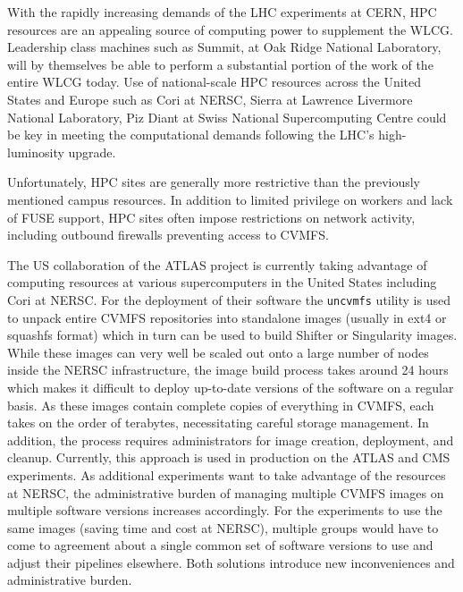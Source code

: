 \documentclass[sigconf]{acmart}
\begin{document}
With the rapidly increasing demands of the LHC experiments at CERN,
HPC resources are an appealing source of computing power to supplement the WLCG.
Leadership class machines such as Summit, at Oak Ridge National Laboratory, will by themselves be able to perform a substantial portion of the work of the entire WLCG today.
Use of national-scale HPC resources across the United States and Europe such as Cori at NERSC, Sierra at Lawrence Livermore National Laboratory, Piz Diant at Swiss National Supercomputing Centre could be key in meeting the computational demands following the LHC's high-luminosity upgrade.

Unfortunately, HPC sites are generally more restrictive than the previously mentioned campus resources.
In addition to limited privilege on workers and lack of FUSE support,
HPC sites often impose restrictions on network activity,
including outbound firewalls preventing access to CVMFS.

The US collaboration of the ATLAS project is currently taking advantage of computing resources at various supercomputers in the United States including Cori at NERSC.
For the deployment of their software the \texttt{uncvmfs} utility is used to unpack entire CVMFS repositories into standalone images (usually in ext4 or squashfs format) which in turn can be used to build Shifter or Singularity images.
While these images can very well be scaled out onto a large number of nodes inside the NERSC infrastructure,
the image build process takes around 24 hours which makes it difficult to deploy up-to-date versions of the software on a regular basis.
As these images contain complete copies of everything in CVMFS,
each takes on the order of terabytes,
necessitating careful storage management.
In addition, the process requires administrators for image creation, deployment, and cleanup.
Currently, this approach is used in production on the ATLAS and CMS experiments.
As additional experiments want to take advantage of the resources at NERSC,
the administrative burden of managing multiple CVMFS images on multiple software versions increases accordingly.
For the experiments to use the same images (saving time and cost at NERSC),
multiple groups would have to come to agreement about a single common set of software versions to use and adjust their pipelines elsewhere.
Both solutions introduce new inconveniences and administrative burden.
\end{document}
